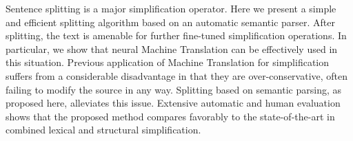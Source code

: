 Sentence splitting is a major simplification operator. Here we present a simple and efficient splitting algorithm based on an automatic semantic parser. After splitting, the text is amenable for further fine-tuned simplification operations. In particular, we show that neural Machine Translation can be effectively used in this situation. Previous application of Machine Translation for simplification suffers from a considerable disadvantage in that they are over-conservative, often failing to modify the source in any way. Splitting based on semantic parsing, as proposed here, alleviates this issue. Extensive automatic and human evaluation shows that the proposed method compares favorably to the state-of-the-art in combined lexical and structural simplification.
